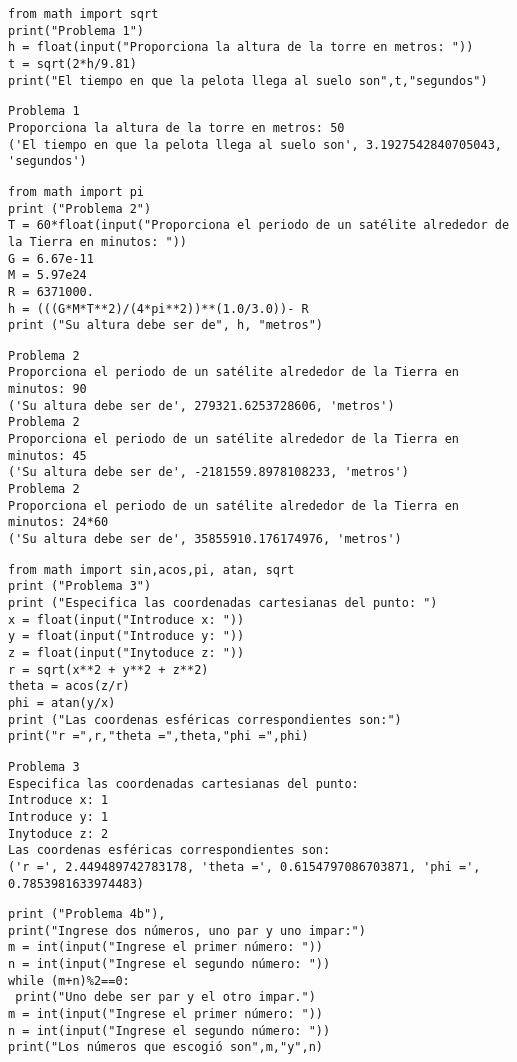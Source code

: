 \documentclass[12pt]{article}
\begin{document}
\begin{verbatim}
from math import sqrt
print("Problema 1")
h = float(input("Proporciona la altura de la torre en metros: "))
t = sqrt(2*h/9.81)
print("El tiempo en que la pelota llega al suelo son",t,"segundos")
\end{verbatim}
\begin{verbatim}
Problema 1
Proporciona la altura de la torre en metros: 50
('El tiempo en que la pelota llega al suelo son', 3.1927542840705043, 'segundos')
\end{verbatim}
\pagebreak
\begin{verbatim}
from math import pi
print ("Problema 2")
T = 60*float(input("Proporciona el periodo de un satélite alrededor de la Tierra en minutos: "))
G = 6.67e-11
M = 5.97e24
R = 6371000.
h = (((G*M*T**2)/(4*pi**2))**(1.0/3.0))- R
print ("Su altura debe ser de", h, "metros")
\end{verbatim}
\begin{verbatim}
Problema 2
Proporciona el periodo de un satélite alrededor de la Tierra en minutos: 90
('Su altura debe ser de', 279321.6253728606, 'metros')
Problema 2
Proporciona el periodo de un satélite alrededor de la Tierra en minutos: 45
('Su altura debe ser de', -2181559.8978108233, 'metros')
Problema 2
Proporciona el periodo de un satélite alrededor de la Tierra en minutos: 24*60
('Su altura debe ser de', 35855910.176174976, 'metros')
\end{verbatim}
\pagebreak
\begin{verbatim}
from math import sin,acos,pi, atan, sqrt
print ("Problema 3")
print ("Especifica las coordenadas cartesianas del punto: ")
x = float(input("Introduce x: "))
y = float(input("Introduce y: "))
z = float(input("Inytoduce z: "))
r = sqrt(x**2 + y**2 + z**2)
theta = acos(z/r)
phi = atan(y/x)
print ("Las coordenas esféricas correspondientes son:")
print("r =",r,"theta =",theta,"phi =",phi)
\end{verbatim}
\begin{verbatim}
Problema 3
Especifica las coordenadas cartesianas del punto: 
Introduce x: 1
Introduce y: 1
Inytoduce z: 2
Las coordenas esféricas correspondientes son:
('r =', 2.449489742783178, 'theta =', 0.6154797086703871, 'phi =', 0.7853981633974483)
\end{verbatim}
\pagebreak
\begin{verbatim}
print ("Problema 4b"),
print("Ingrese dos números, uno par y uno impar:")
m = int(input("Ingrese el primer número: "))
n = int(input("Ingrese el segundo número: "))
while (m+n)%2==0:
 print("Uno debe ser par y el otro impar.")
m = int(input("Ingrese el primer número: "))
n = int(input("Ingrese el segundo número: "))
print("Los números que escogió son",m,"y",n)
\end{verbatim}
\end{document}
